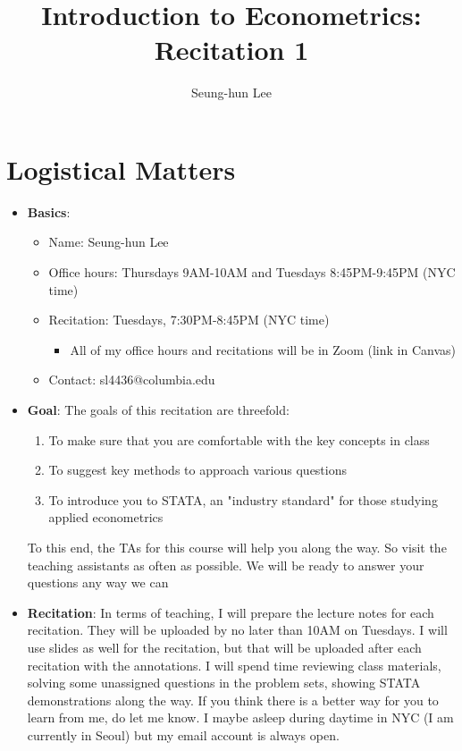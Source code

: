 \documentclass[12pt]{article}
\title{Introduction to Econometrics: Recitation 1}
\theoremstyle{definition}
\theoremstyle{property}
\theoremstyle{assumption}
\theoremstyle{example}
\theoremstyle{comment}
\begin{document}
\linespread{1.25}
\author{Seung-hun Lee}
\date{}
\maketitle
\section{Logistical Matters}
\begin{itemize}
\item \textbf{Basics}: 
\begin{itemize}
\item Name: Seung-hun Lee
\item Office hours: Thursdays 9AM-10AM and Tuesdays 8:45PM-9:45PM (NYC time)
\item Recitation: Tuesdays, 7:30PM-8:45PM (NYC time)
\begin{itemize}
\item All of my office hours and recitations will be in Zoom (link in Canvas)
\end{itemize}
\item Contact: sl4436@columbia.edu
\end{itemize}
\item \textbf{Goal}: The goals of this recitation are threefold: 
\begin{enumerate}
\item To make sure that you are comfortable with the key concepts in class
\item To suggest key methods to approach various questions
\item To introduce you to STATA, an "industry standard" for those studying applied econometrics
\end{enumerate}
To this end, the TAs for this course will help you along the way. So visit the teaching assistants as often as possible. We will be ready to answer your questions any way we can
\item \textbf{Recitation}: In terms of teaching, I will prepare the lecture notes for each recitation. They will be uploaded by no later than 10AM on Tuesdays. I will use slides as well for the recitation, but that will be uploaded after each recitation with the annotations. I will spend time reviewing class materials, solving some unassigned questions in the problem sets, showing STATA demonstrations along the way. If you think there is a better way for you to learn from me, do let me know. I maybe asleep during daytime in NYC (I am currently in Seoul) but my email account is always open.


\end{itemize}
\end{document}
